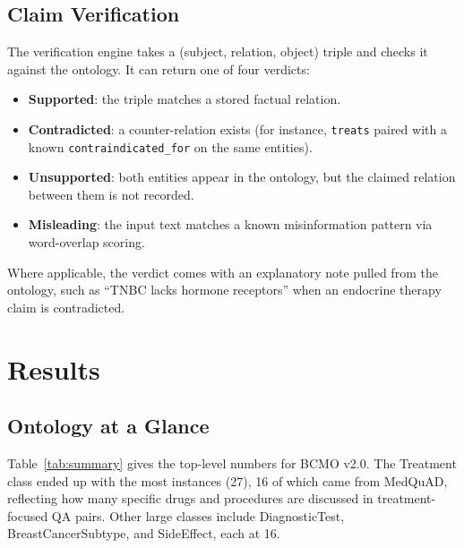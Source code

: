 \documentclass[10pt,a4paper]{article}
\begin{document}
\subsection{Claim Verification}

The verification engine takes a (subject, relation, object) triple and checks it against the ontology. It can return one of four verdicts:

\begin{itemize}
    \item \textbf{Supported}: the triple matches a stored factual relation.
    \item \textbf{Contradicted}: a counter-relation exists (for instance, \texttt{treats} paired with a known \texttt{contraindicated\_for} on the same entities).
    \item \textbf{Unsupported}: both entities appear in the ontology, but the claimed relation between them is not recorded.
    \item \textbf{Misleading}: the input text matches a known misinformation pattern via word-overlap scoring.
\end{itemize}

Where applicable, the verdict comes with an explanatory note pulled from the ontology, such as ``TNBC lacks hormone receptors'' when an endocrine therapy claim is contradicted.

\section{Results}
\label{sec:results}

\subsection{Ontology at a Glance}

Table~\ref{tab:summary} gives the top-level numbers for BCMO v2.0. The Treatment class ended up with the most instances (27), 16 of which came from MedQuAD, reflecting how many specific drugs and procedures are discussed in treatment-focused QA pairs. Other large classes include DiagnosticTest, BreastCancerSubtype, and SideEffect, each at 16.
\end{document}
